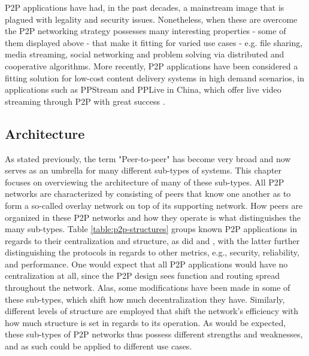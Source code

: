     P2P applications have had, in the past decades, a mainstream image that is plagued with legality and security issues.
    Nonetheless, when these are overcome the P2P networking strategy possesses many interesting properties - some of them displayed above - that make it fitting for varied use cases - e.g. file sharing, media streaming, social networking and problem solving via distributed and cooperative algorithms.
    More recently, P2P applications have been considered a fitting solution for low-cost content delivery systems in high demand scenarios, in applications such as PPStream and PPLive in China, which offer live video streaming through P2P with great success \cite{cisco}.

\subsection{Architecture}

    As stated previously, the term "Peer-to-peer" has become very broad and now serves as an umbrella for many different sub-types of systems.
    This chapter focuses on overviewing the architecture of many of these sub-types.
    All P2P networks are characterized by consisting of peers that know one another as to form a so-called overlay network on top of its supporting network.
    How peers are organized in these P2P networks and how they operate is what distinguishes the many sub-types.
    Table \ref{table:p2p-structures} groups known P2P applications in regards to their centralization and structure, as did \cite{p2p-survey-1} and \cite{p2p-survey-2}, with the latter further distinguishing the protocols in regards to other metrics, e.g., security, reliability, and performance.
    One would expect that all P2P applications would have no centralization at all, since the P2P design sees function and routing spread throughout the network.
    Alas, some modifications have been made in some of these sub-types, which shift how much decentralization they have.
    Similarly, different levels of structure are employed that shift the network's efficiency with how much structure is set in regards to its operation.
    As would be expected, these sub-types of P2P networks thus possess different strengths and weaknesses, and as such could be applied to different use cases.

